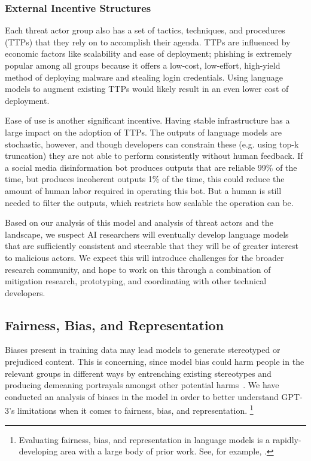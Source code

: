 \documentclass{article}
\begin{document}
     
    
        \subsubsection{External Incentive Structures}
        \label{section:External_Incentive_Structures}
        Each threat actor group also has a set of tactics, techniques, and procedures (TTPs) that they rely on to accomplish their agenda. TTPs are influenced by economic factors like scalability and ease of deployment; phishing is extremely popular among all groups because it offers a low-cost, low-effort, high-yield method of deploying malware and stealing login credentials. Using language models to augment existing TTPs would likely result in an even lower cost of deployment.

Ease of use is another significant incentive. Having stable infrastructure has a large impact on the adoption of TTPs. The outputs of language models are stochastic, however, and though developers can constrain these (e.g. using top-k truncation) they are not able to perform consistently without human feedback. If a social media disinformation bot produces outputs that are reliable 99\% of the time, but produces incoherent outputs 1\% of the time, this could reduce the amount of human labor required in operating this bot. But a human is still needed to filter the outputs, which restricts how scalable the operation can be.

Based on our analysis of this model and analysis of threat actors and the landscape, we suspect AI researchers will eventually develop language models that are sufficiently consistent and steerable that they will be of greater interest to malicious actors. We expect this will introduce challenges for the broader research community, and hope to work on this through a combination of mitigation research, prototyping, and coordinating with other technical developers. 
 
    \subsection{Fairness, Bias, and Representation}
    \label{section:Fairness_Bias_and_Representation}
     Biases present in training data may lead models to generate stereotyped or prejudiced content. This is concerning, since model bias could harm people in the relevant groups in different ways by entrenching existing stereotypes and producing demeaning portrayals amongst other potential harms~\cite{youtube}. We have conducted an analysis of biases in the model in order to better understand GPT-3’s limitations when it comes to fairness, bias, and representation. \footnote{Evaluating fairness, bias, and representation in language models is a rapidly-developing area with a large body of prior work. See, for example, \cite{huang2019reducing, nadeem2020stereoset, sheng2019woman}.}
 
\end{document}
